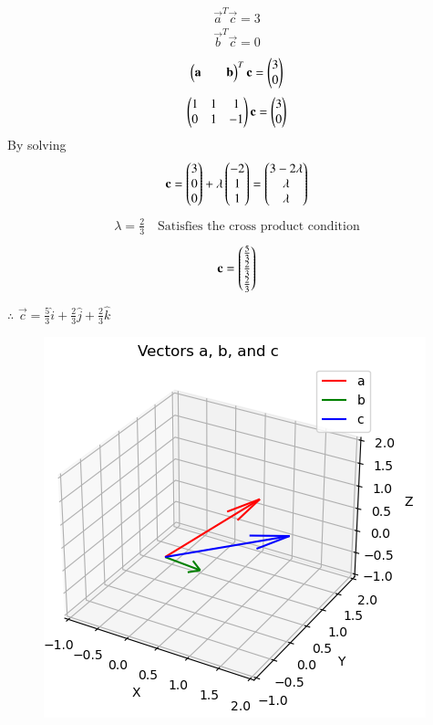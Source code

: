 \documentclass[journal,12pt,onecolumn]{IEEEtran}
\begin{document}
    \begin{align}
        \vec{a}^T\vec{c}=3\\
        \vec{b}^T\vec{c}=0
    \end{align}
    \begin{align}
        \begin{pmatrix}\mathbf{a} && \mathbf{b}\end{pmatrix}^T\mathbf{c}=\begin{pmatrix}3\\0\end{pmatrix}
    \end{align}
   \begin{align}
       \begin{pmatrix}1&1&1\\0&1&-1\end{pmatrix}\mathbf{c}=\begin{pmatrix}3\\0\end{pmatrix}
   \end{align}
   By solving\\
   \begin{align}
       \mathbf{c}=\begin{pmatrix}3\\0\\0\end{pmatrix}+\lambda \begin{pmatrix}-2\\1\\1\end{pmatrix}=\begin{pmatrix}3-2\lambda \\ \lambda \\ \lambda\end{pmatrix}
   \end{align}
 \begin{align}
	 \lambda=\frac{2}{3} \quad \text{Satisfies the cross product condition}
   \end{align}
   \begin{align}
       \mathbf{c}=\begin{pmatrix}\frac{5}{3}\\ \frac{2}{3}\\ \frac{2}{3}\end{pmatrix}
   \end{align}
   \begin{center}
   $\therefore$ $\vec{c}=\frac{5}{3}\hat{i}+\frac{2}{3}\hat{j}+\frac{2}{3}\hat{k}$
   \end{center}
   \begin{figure}[H]
	   \centering
	   \includegraphics[width=0.7\linewidth]{figs/fig1.png}
	   \caption{}
	   \label{fig}
   \end{figure}
   
\end{document}
